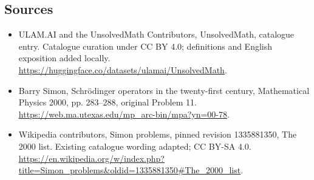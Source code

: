 \documentclass[11pt]{article}
\begin{document}
\subsection{Sources}
\begin{itemize}
\item[\hypertarget{source:statement:1}{S1}] ULAM.AI and the UnsolvedMath Contributors, UnsolvedMath, catalogue entry. Catalogue curation under CC BY 4.0; definitions and English exposition added locally.
\url{https://huggingface.co/datasets/ulamai/UnsolvedMath}.
\item[\hypertarget{source:statement:2}{S2}] Barry Simon, Schrödinger operators in the twenty-first century, Mathematical Physics 2000, pp. 283–288, original Problem 11.
\url{https://web.ma.utexas.edu/mp_arc-bin/mpa?yn=00-78}.
\item[\hypertarget{source:statement:3}{S3}] Wikipedia contributors, Simon problems, pinned revision 1335881350, The 2000 list. Existing catalogue wording adapted; CC BY-SA 4.0.
\url{https://en.wikipedia.org/w/index.php?title=Simon_problems&oldid=1335881350#The_2000_list}.
\end{itemize}
\label{end:statement}
\end{document}
